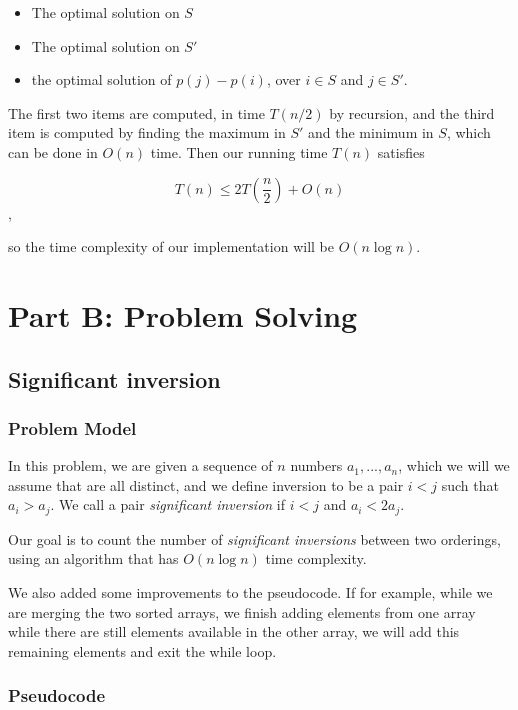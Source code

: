 \documentclass{article}
\begin{document}
\begin{itemize}
 \item The optimal solution on $S$
 \item The optimal solution on $S'$
 \item the optimal solution of $p(j)-p(i)$, over $i \in S$ and $j \in S'$.
\end{itemize}

The first two items are computed, in time $T(n/2)$ by recursion, and the third item is computed by finding the maximum in $S'$ and the minimum in $S$, which can be done in $O(n)$ time. Then our running time $T(n)$ satisfies

$$T(n) \leq 2T(\frac{n}{2})+O(n)$$,

so the time complexity of our implementation will be $O(n\log n)$.


\section*{Part B: Problem Solving}

\subsection*{Significant inversion}

\subsubsection*{Problem Model}

In this problem, we are given a sequence of $n$ numbers $a_1,...,a_n$, which we will we assume that are all distinct, and we define inversion to be a pair $i<j$ such that $a_i>a_j$. We call a pair \textit{significant inversion} if $i<j$ and $a_i<2a_j$.

Our goal is to count the number of \textit{significant inversions} between two orderings, using an algorithm that has $O(n \log n)$ time complexity.

We also added some improvements to the pseudocode. If for example, while we are merging the two sorted arrays, we finish adding elements from one array while there are still elements available in the other array, we will add this remaining elements and exit the while loop.

\subsubsection*{Pseudocode}
\end{document}
